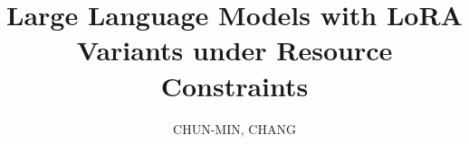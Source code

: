 \documentclass[journal]{IEEEtran}
\begin{document}
%
\title{Large Language Models with LoRA Variants under Resource Constraints}
\author{CHUN-MIN, CHANG}
%
%
%


% 
%
\end{document}

